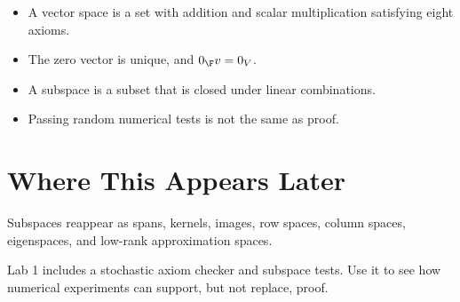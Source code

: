 \begin{itemize}
  \item A vector space is a set with addition and scalar multiplication
    satisfying eight axioms.
  \item The zero vector is unique, and $0_{\F}v=0_V$.
  \item A subspace is a subset that is closed under linear combinations.
  \item Passing random numerical tests is not the same as proof.
\end{itemize}

\section*{Where This Appears Later}

Subspaces reappear as spans, kernels, images, row spaces, column spaces,
eigenspaces, and low-rank approximation spaces.

\begin{labbox}
Lab 1 includes a stochastic axiom checker and subspace tests. Use it to see
how numerical experiments can support, but not replace, proof.
\end{labbox}


